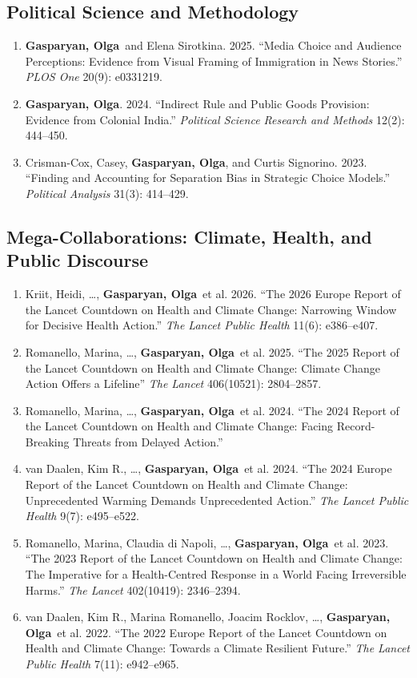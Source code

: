 \documentclass[10pt]{article}
\newcommand{\me}{\textbf{Gasparyan, Olga}}
\begin{document}
\subsection{Political Science and Methodology}
\begin{enumerate}
    \item \me\ and Elena Sirotkina. 2025. ``Media Choice and Audience Perceptions: Evidence from Visual Framing of Immigration in News Stories.'' \textit{PLOS One} 20(9): e0331219. 

    \item \me. 2024. ``Indirect Rule and Public Goods Provision: Evidence from Colonial India.'' \textit{Political Science Research and Methods} 12(2): 444--450.

    \item Crisman-Cox, Casey, \me, and Curtis Signorino. 2023. ``Finding and Accounting for Separation Bias in Strategic Choice Models.'' \textit{Political Analysis} 31(3): 414--429.
\end{enumerate}

\subsection{Mega-Collaborations: Climate, Health, and Public Discourse}
\begin{enumerate}[resume]
    \item Kriit, Heidi, \ldots, \me\ et al. 2026. ``The 2026 Europe Report of the Lancet Countdown on Health and Climate Change: Narrowing Window for Decisive Health Action.'' \textit{The Lancet Public Health} 11(6): e386--e407.

    \item Romanello, Marina, \ldots, \me\ et al. 2025. ``The 2025 Report of the Lancet Countdown on Health and Climate Change: Climate Change Action Offers a Lifeline'' \textit{The Lancet} 406(10521): 2804--2857. 

    \item Romanello, Marina, \ldots, \me\ et al. 2024. ``The 2024 Report of the Lancet Countdown on Health and Climate Change: Facing Record-Breaking Threats from Delayed Action.'' 

    \item van Daalen, Kim R., \ldots, \me\ et al. 2024. ``The 2024 Europe Report of the Lancet Countdown on Health and Climate Change: Unprecedented Warming Demands Unprecedented Action.'' \textit{The Lancet Public Health} 9(7): e495--e522. 

    \item Romanello, Marina, Claudia di Napoli, \ldots, \me\ et al. 2023. ``The 2023 Report of the Lancet Countdown on Health and Climate Change: The Imperative for a Health-Centred Response in a World Facing Irreversible Harms.'' \textit{The Lancet} 402(10419): 2346--2394.

    \item van Daalen, Kim R., Marina Romanello, Joacim Rocklov, \ldots, \me\ et al. 2022. ``The 2022 Europe Report of the Lancet Countdown on Health and Climate Change: Towards a Climate Resilient Future.'' \textit{The Lancet Public Health} 7(11): e942--e965.
\end{enumerate}
\end{document}
